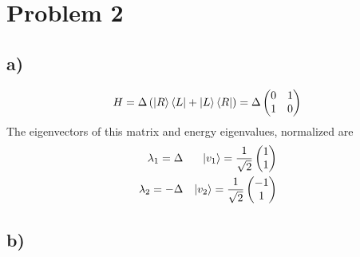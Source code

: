 \documentclass[]{article}
\begin{document}
\hypertarget{problem-2}{%
\section{Problem 2}\label{problem-2}}

\hypertarget{a}{%
\subsection{a)}\label{a}}

\[
H = \Delta \left(\ket{R}\bra{L}+\ket{L}\bra{R} \right) = \Delta \begin{pmatrix}
0 & 1 \\
1 & 0
\end{pmatrix} 
\] The eigenvectors of this matrix and energy eigenvalues, normalized
are \[
\begin{align}
\lambda_{1} = \Delta  &  & \ket{v_{1}}  = \frac{1}{\sqrt{ 2 }}\begin{pmatrix}
1 \\
1
\end{pmatrix} \\
\lambda_{2} = -\Delta  &  & \ket{v_{2}}  = \frac{1}{\sqrt{ 2 }}\begin{pmatrix}
-1 \\
1
\end{pmatrix}
\end{align}
\]

\hypertarget{b}{%
\subsection{b)}\label{b}}
\end{document}
